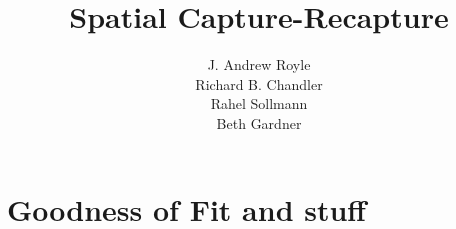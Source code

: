 \documentclass{book}
\begin{document}
\title{ Spatial Capture-Recapture  }
\subtitle{
}
\author{J. Andrew Royle \\
Richard B. Chandler \\
Rahel Sollmann \\
Beth Gardner}


\address{
USGS Patuxent Wildlife Research Center \\
North Carolina State University
}

\maketitle

\newpage

\setcounter{tocdepth}{2}
\tableofcontents


















\chapter{Goodness of Fit and stuff}
\label{chapt.gof}




\end{document}

